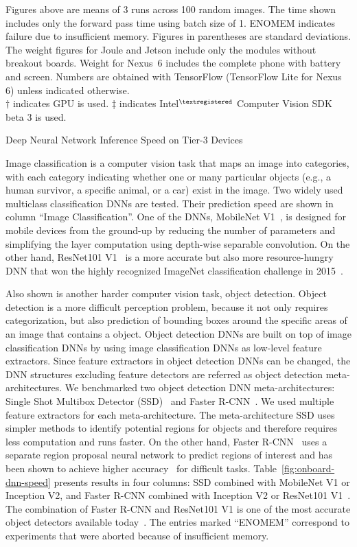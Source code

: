 \begin{table}
\begin{captiontext}
Figures above are means of 3 runs across 100 random images. The time shown
includes only the forward pass time using batch size of 1. ENOMEM indicates
failure due to insufficient memory. Figures in parentheses are standard
deviations. The weight figures for Joule and Jetson include only the modules
without breakout boards. Weight for Nexus~6 includes the complete phone with
battery and screen. Numbers are obtained with TensorFlow (TensorFlow Lite for
Nexus 6) unless indicated otherwise. \\
$\dagger$ indicates GPU is used. $\ddagger$ indicates
Intel$^{\tiny\textregistered}$ Computer Vision SDK beta 3 is used.
\end{captiontext}
\caption{Deep Neural Network Inference Speed on Tier-3 Devices}
\label{fig:onboard-dnn-speed}
\end{table}

Image classification is a computer vision task that maps an image into
categories, with each category indicating whether one or many particular objects
(e.g., a human survivor, a specific animal, or a car) exist in the image. Two
widely used multiclass classification DNNs are tested. Their prediction speed
are shown in column ``Image Classification''. One of the DNNs, MobileNet
V1~\cite{Howard2017}, is designed for mobile devices from the ground-up by
reducing the number of parameters and simplifying the layer computation using
depth-wise separable convolution. On the other hand, ResNet101 V1~\cite{He2016}
is a more accurate but also more resource-hungry DNN that won the highly
recognized ImageNet classification challenge in 2015~\cite{Russakovsky15}. 

Also shown is another harder computer vision task, object detection. Object
detection is a more difficult perception problem, because it not only requires
categorization, but also prediction of bounding boxes around the specific areas
of an image that contains a object. Object detection DNNs
are built on top of image classification DNNs by using image classification DNNs
as low-level feature extractors. Since feature extractors in object detection
DNNs can be changed, the DNN structures excluding feature detectors are referred
as object detection meta-architectures. We benchmarked two object detection DNN
meta-architectures: Single Shot Multibox Detector (SSD)~\cite{Liu2016} and
Faster R-CNN~\cite{Ren2015}. We used multiple feature extractors for each
meta-architecture. The meta-architecture SSD uses simpler methods to identify
potential regions for objects and therefore requires less computation and runs
faster. On the other hand, Faster R-CNN~\cite{Ren2015} uses a separate region
proposal neural network to predict regions of interest and has been shown to
achieve higher accuracy~\cite{Huang2017} for difficult tasks.
Table~\ref{fig:onboard-dnn-speed} presents results in four columns: SSD
combined with MobileNet V1 or Inception V2, and Faster R-CNN combined with
Inception V2 or ResNet101 V1~\cite{He2016}. The combination of Faster R-CNN and
ResNet101 V1 is one of the most accurate object detectors available
today~\cite{Russakovsky15}. The entries marked ``{\sc ENOMEM}'' correspond to
experiments that were aborted because of insufficient memory.

